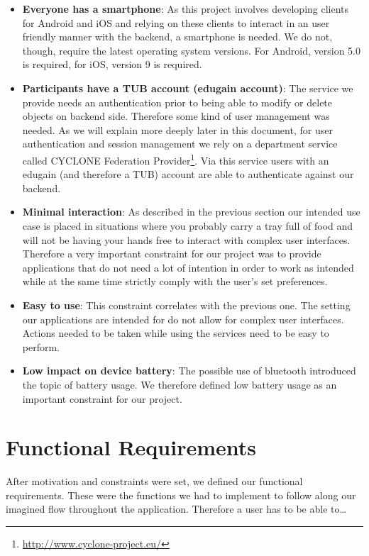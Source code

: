 \begin{itemize}
    \item \textbf{Everyone has a smartphone}: As this project involves developing clients for Android and iOS and relying on these clients to interact in an user friendly manner with the backend, a smartphone is needed. We do not, though, require the latest operating system versions. For Android, version 5.0 is required, for iOS, version 9 is required.
    \item \textbf{Participants have a TUB account (edugain account)}: The service we provide needs an authentication prior to being able to modify or delete objects on backend side. Therefore some kind of user management was needed. As we will explain more deeply later in this document, for user authentication and session management we rely on a department service called CYCLONE Federation Provider\footnote{\url{http://www.cyclone-project.eu/}}. Via this service users with an edugain (and therefore a TUB) account are able to authenticate against our backend.
    \item \textbf{Minimal interaction}: As described in the previous section our intended use case is placed in situations where you probably carry a tray full of food and will not be having your hands free to interact with complex user interfaces. Therefore a very important constraint for our project was to provide applications that do not need a lot of intention in order to work as intended while at the same time strictly comply with the user's set preferences.
    \item \textbf{Easy to use}: This constraint correlates with the previous one. The setting our applications are intended for do not allow for complex user interfaces. Actions needed to be taken while using the services need to be easy to perform.
    \item \textbf{Low impact on device battery}: The possible use of bluetooth introduced the topic of battery usage. We therefore defined low battery usage as an important constraint for our project.
\end{itemize}


\vspace{0.5cm}

\section{Functional Requirements}

After motivation and constraints were set, we defined our functional requirements. These were the functions we had to implement to follow along our imagined flow throughout the application. Therefore a user has to be able to\ldots

